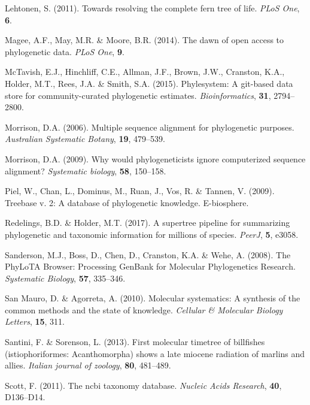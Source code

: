 \documentclass[]{article}
\begin{document}
\leavevmode\hypertarget{ref-lehtonen2011towards}{}%
Lehtonen, S. (2011). Towards resolving the complete fern tree of life. \emph{PLoS One}, \textbf{6}.

\leavevmode\hypertarget{ref-magee2014dawn}{}%
Magee, A.F., May, M.R. \& Moore, B.R. (2014). The dawn of open access to phylogenetic data. \emph{PLoS One}, \textbf{9}.

\leavevmode\hypertarget{ref-mctavish2015phylesystem}{}%
McTavish, E.J., Hinchliff, C.E., Allman, J.F., Brown, J.W., Cranston, K.A., Holder, M.T., Rees, J.A. \& Smith, S.A. (2015). Phylesystem: A git-based data store for community-curated phylogenetic estimates. \emph{Bioinformatics}, \textbf{31}, 2794--2800.

\leavevmode\hypertarget{ref-morrison2006multiple}{}%
Morrison, D.A. (2006). Multiple sequence alignment for phylogenetic purposes. \emph{Australian Systematic Botany}, \textbf{19}, 479--539.

\leavevmode\hypertarget{ref-morrison2009would}{}%
Morrison, D.A. (2009). Why would phylogeneticists ignore computerized sequence alignment? \emph{Systematic biology}, \textbf{58}, 150--158.

\leavevmode\hypertarget{ref-piel2009treebase}{}%
Piel, W., Chan, L., Dominus, M., Ruan, J., Vos, R. \& Tannen, V. (2009). Treebase v. 2: A database of phylogenetic knowledge. E-biosphere.

\leavevmode\hypertarget{ref-redelings2017supertree}{}%
Redelings, B.D. \& Holder, M.T. (2017). A supertree pipeline for summarizing phylogenetic and taxonomic information for millions of species. \emph{PeerJ}, \textbf{5}, e3058.

\leavevmode\hypertarget{ref-sanderson2008phylota}{}%
Sanderson, M.J., Boss, D., Chen, D., Cranston, K.A. \& Wehe, A. (2008). The PhyLoTA Browser: Processing GenBank for Molecular Phylogenetics Research. \emph{Systematic Biology}, \textbf{57}, 335--346.

\leavevmode\hypertarget{ref-san2010molecular}{}%
San Mauro, D. \& Agorreta, A. (2010). Molecular systematics: A synthesis of the common methods and the state of knowledge. \emph{Cellular \& Molecular Biology Letters}, \textbf{15}, 311.

\leavevmode\hypertarget{ref-santini2013first}{}%
Santini, F. \& Sorenson, L. (2013). First molecular timetree of billfishes (istiophoriformes: Acanthomorpha) shows a late miocene radiation of marlins and allies. \emph{Italian journal of zoology}, \textbf{80}, 481--489.

\leavevmode\hypertarget{ref-scott2011ncbi}{}%
Scott, F. (2011). The ncbi taxonomy database. \emph{Nucleic Acids Research}, \textbf{40}, D136--D14.
\end{document}
